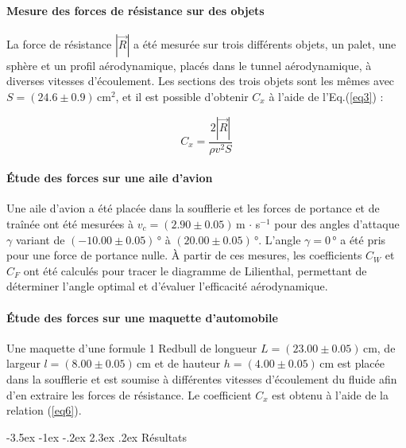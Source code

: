 \documentclass[a4paper, 12pt,oneside]{article}
\makeatletter
\renewcommand{\section}{\@startsection {section}{1}{\z@}%
             {-3.5ex \@plus -1ex \@minus -.2ex}%
             {2.3ex \@plus.2ex}%
             {\normalfont\normalsize\bfseries}}
\makeatother
\begin{document}
\paragraph{Mesure des forces de résistance sur des objets}

La force de résistance $|\vec{R}|$ a été mesurée sur trois différents objets, un palet, une sphère et un profil aérodynamique, placés dans le tunnel aérodynamique, à diverses vitesses d'écoulement. Les sections des trois objets sont les mêmes avec $S=(24.6\pm0.9)$\,cm$^2$, et il est possible d'obtenir $C_x$ à l’aide de l'Eq.(\ref{eq3}) :

\begin{equation}
C_x = \frac{2 |\vec{R}|}{\rho v^2 S}
\label{eq6}
\end{equation}

\vspace{-0.4cm}
\paragraph{Étude des forces sur une aile d’avion}

Une aile d’avion a été placée dans la soufflerie et les forces de portance et de traînée ont été mesurées à $v_c=(2.90\pm0.05)$\,m $\cdot$ s$^{-1}$ pour des angles d’attaque $\gamma$ variant de $(-10.00\pm0.05)$\,° à $(20.00\pm0.05)$\,°. L'angle $\gamma=0$\,° a été pris pour une force de portance nulle. À partir de ces mesures, les coefficients $C_W$ et $C_F$ ont été calculés pour tracer le diagramme de Lilienthal, permettant de déterminer l’angle optimal et d’évaluer l’efficacité aérodynamique.  

\vspace{-0.3cm}
\paragraph{Étude des forces sur une maquette d'automobile}

Une maquette d'une formule 1 Redbull de longueur $L=(23.00\pm0.05)$\,cm, de largeur $l=(8.00\pm0.05)$\,cm et de hauteur $h=(4.00\pm0.05)$\,cm est placée dans la soufflerie et est soumise à différentes vitesses d'écoulement du fluide afin d'en extraire les forces de résistance. Le coefficient $C_x$ est obtenu à l'aide de la relation (\ref{eq6}).

\vspace{-0.45cm}
\section{Résultats}
\end{document}
